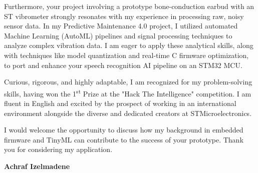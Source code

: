 \documentclass[10pt,a4paper]{altacv}
\begin{document}
Furthermore, your project involving a prototype bone-conduction earbud with an ST vibrometer strongly resonates with my experience in processing raw, noisy sensor data. In my Predictive Maintenance 4.0 project, I utilized automated Machine Learning (AutoML) pipelines and signal processing techniques to analyze complex vibration data. I am eager to apply these analytical skills, along with techniques like model quantization and real-time C firmware optimization, to port and enhance your speech recognition AI pipeline on an STM32 MCU.

\vspace{0.4cm}

Curious, rigorous, and highly adaptable, I am recognized for my problem-solving skills, having won the 1\textsuperscript{st} Prize at the "Hack The Intelligence" competition. I am fluent in English and excited by the prospect of working in an international environment alongside the diverse and dedicated creators at STMicroelectronics. 

\vspace{0.4cm}

I would welcome the opportunity to discuss how my background in embedded firmware and TinyML can contribute to the success of your prototype. Thank you for considering my application.

\vspace{0.5cm}

\vfill

\begin{flushright}
  \Large\color{emphasis}\textbf{Achraf Izelmadene}
\end{flushright}
\end{document}
